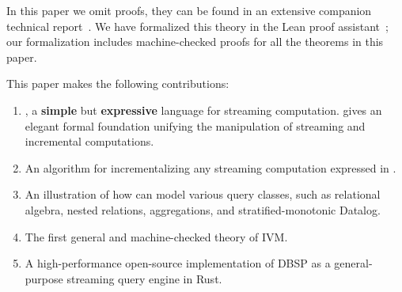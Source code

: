 In this paper we omit proofs, they can be found in an extensive
companion technical report~\cite{tr}.  We have formalized
this theory in the Lean proof
assistant~\cite{dbsp-theory}; our formalization includes
machine-checked proofs for all the theorems in this
paper.

This paper makes the following contributions:
\begin{enumerate}[nosep, leftmargin=0pt, itemindent=0.5cm, label=\textbf{(\arabic{*})}]
  \item \dbsp, a \textbf{simple} but \textbf{expressive} language for streaming
  computation. \dbsp gives an elegant formal foundation unifying the manipulation of
  streaming and incremental computations.
  \item An algorithm for incrementalizing any streaming computation expressed in
  \dbsp.
  \item An illustration of how \dbsp can model various query classes, such as relational algebra,
  nested relations, aggregations, and stratified-monotonic Datalog.
  \item The first general and machine-checked theory of IVM.
  \item A high-performance open-source implementation of DBSP as a
  general-purpose streaming query engine in Rust.
\end{enumerate}
